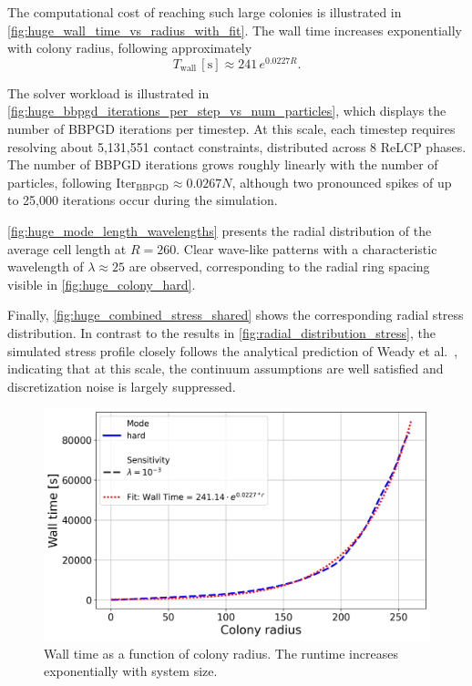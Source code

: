 \documentclass[conference]{IEEEtran}
\begin{document}
The computational cost of reaching such large colonies is illustrated in \autoref{fig:huge_wall_time_vs_radius_with_fit}. The wall time increases exponentially with colony radius, following approximately
\[
    T_\text{wall}\,[\mathrm{s}] \approx 241\, e^{0.0227R}.
\]

The solver workload is illustrated in \autoref{fig:huge_bbpgd_iterations_per_step_vs_num_particles}, which displays the number of BBPGD iterations per timestep. At this scale, each timestep requires resolving about 5{,}131{,}551 contact constraints, distributed across 8 ReLCP phases. The number of BBPGD iterations grows roughly linearly with the number of particles, following $\text{Iter}_{\text{BBPGD}} \approx 0.0267N$, although two pronounced spikes of up to 25{,}000 iterations occur during the simulation.

\autoref{fig:huge_mode_length_wavelengths} presents the radial distribution of the average cell length at $R = 260$. Clear wave-like patterns with a characteristic wavelength of $\lambda \approx 25$ are observed, corresponding to the radial ring spacing visible in \autoref{fig:huge_colony_hard}.

Finally, \autoref{fig:huge_combined_stress_shared} shows the corresponding radial stress distribution. In contrast to the results in \autoref{fig:radial_distribution_stress}, the simulated stress profile closely follows the analytical prediction of Weady et al.~\cite{Weady2024SM}, indicating that at this scale, the continuum assumptions are well satisfied and discretization noise is largely suppressed.

\begin{figure}[h]
    \centering
    \includegraphics[width=\linewidth]{figures/huge/huge_wall_time_vs_radius_with_fit.png}
    \caption{Wall time as a function of colony radius. The runtime increases exponentially with system size.}
    \label{fig:huge_wall_time_vs_radius_with_fit}
\end{figure}
\end{document}
